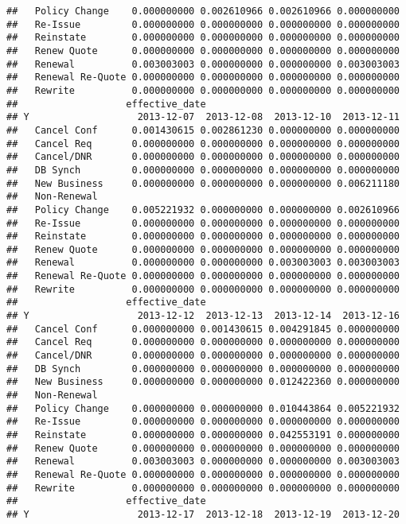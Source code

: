 \documentclass[]{article}
\begin{document}
\begin{verbatim}
##   Policy Change    0.000000000 0.002610966 0.002610966 0.000000000
##   Re-Issue         0.000000000 0.000000000 0.000000000 0.000000000
##   Reinstate        0.000000000 0.000000000 0.000000000 0.000000000
##   Renew Quote      0.000000000 0.000000000 0.000000000 0.000000000
##   Renewal          0.003003003 0.000000000 0.000000000 0.003003003
##   Renewal Re-Quote 0.000000000 0.000000000 0.000000000 0.000000000
##   Rewrite          0.000000000 0.000000000 0.000000000 0.000000000
##                   effective_date
## Y                   2013-12-07  2013-12-08  2013-12-10  2013-12-11
##   Cancel Conf      0.001430615 0.002861230 0.000000000 0.000000000
##   Cancel Req       0.000000000 0.000000000 0.000000000 0.000000000
##   Cancel/DNR       0.000000000 0.000000000 0.000000000 0.000000000
##   DB Synch         0.000000000 0.000000000 0.000000000 0.000000000
##   New Business     0.000000000 0.000000000 0.000000000 0.006211180
##   Non-Renewal                                                     
##   Policy Change    0.005221932 0.000000000 0.000000000 0.002610966
##   Re-Issue         0.000000000 0.000000000 0.000000000 0.000000000
##   Reinstate        0.000000000 0.000000000 0.000000000 0.000000000
##   Renew Quote      0.000000000 0.000000000 0.000000000 0.000000000
##   Renewal          0.000000000 0.000000000 0.003003003 0.003003003
##   Renewal Re-Quote 0.000000000 0.000000000 0.000000000 0.000000000
##   Rewrite          0.000000000 0.000000000 0.000000000 0.000000000
##                   effective_date
## Y                   2013-12-12  2013-12-13  2013-12-14  2013-12-16
##   Cancel Conf      0.000000000 0.001430615 0.004291845 0.000000000
##   Cancel Req       0.000000000 0.000000000 0.000000000 0.000000000
##   Cancel/DNR       0.000000000 0.000000000 0.000000000 0.000000000
##   DB Synch         0.000000000 0.000000000 0.000000000 0.000000000
##   New Business     0.000000000 0.000000000 0.012422360 0.000000000
##   Non-Renewal                                                     
##   Policy Change    0.000000000 0.000000000 0.010443864 0.005221932
##   Re-Issue         0.000000000 0.000000000 0.000000000 0.000000000
##   Reinstate        0.000000000 0.000000000 0.042553191 0.000000000
##   Renew Quote      0.000000000 0.000000000 0.000000000 0.000000000
##   Renewal          0.003003003 0.000000000 0.000000000 0.003003003
##   Renewal Re-Quote 0.000000000 0.000000000 0.000000000 0.000000000
##   Rewrite          0.000000000 0.000000000 0.000000000 0.000000000
##                   effective_date
## Y                   2013-12-17  2013-12-18  2013-12-19  2013-12-20

\end{verbatim}
\end{document}
